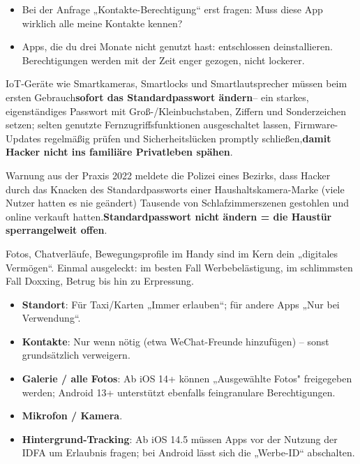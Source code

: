 \begin{itemize}
  \item Bei der Anfrage „Kontakte-Berechtigung“ erst fragen: Muss diese App wirklich alle meine Kontakte kennen?
  \item Apps, die du drei Monate nicht genutzt hast: entschlossen deinstallieren. Berechtigungen werden mit der Zeit enger gezogen, nicht lockerer.
\end{itemize}


IoT-Geräte wie Smartkameras, Smartlocks und Smartlautsprecher müssen beim ersten Gebrauch\textbf{sofort das Standardpasswort ändern}– ein starkes, eigenständiges Passwort mit Groß-/Kleinbuchstaben, Ziffern und Sonderzeichen setzen; selten genutzte Fernzugriffsfunktionen ausgeschaltet lassen, Firmware-Updates regelmäßig prüfen und Sicherheitslücken promptly schließen,\textbf{damit Hacker nicht ins familiäre Privatleben spähen}.

\begin{tcbwarn}{Warnung aus der Praxis}
2022 meldete die Polizei eines Bezirks, dass Hacker durch das Knacken des Standardpassworts einer Haushaltskamera-Marke (viele Nutzer hatten es nie geändert) Tausende von Schlafzimmerszenen gestohlen und online verkauft hatten.\textbf{Standardpasswort nicht ändern = die Haustür sperrangelweit offen}.

\end{tcbwarn}


Fotos, Chatverläufe, Bewegungsprofile im Handy sind im Kern dein „digitales Vermögen“. Einmal ausgeleckt: im besten Fall Werbebelästigung, im schlimmsten Fall Doxxing, Betrug bis hin zu Erpressung.


\begin{itemize}
  \item \textbf{Standort}: Für Taxi/Karten „Immer erlauben“; für andere Apps „Nur bei Verwendung“.
  \item \textbf{Kontakte}: Nur wenn nötig (etwa WeChat-Freunde hinzufügen) – sonst grundsätzlich verweigern.
  \item \textbf{Galerie / alle Fotos}: Ab iOS 14+ können „Ausgewählte Fotos" freigegeben werden; Android 13+ unterstützt ebenfalls feingranulare Berechtigungen.
  \item \textbf{Mikrofon / Kamera}.
  \item \textbf{Hintergrund-Tracking}: Ab iOS 14.5 müssen Apps vor der Nutzung der IDFA um Erlaubnis fragen; bei Android lässt sich die „Werbe-ID“ abschalten.
\end{itemize}

